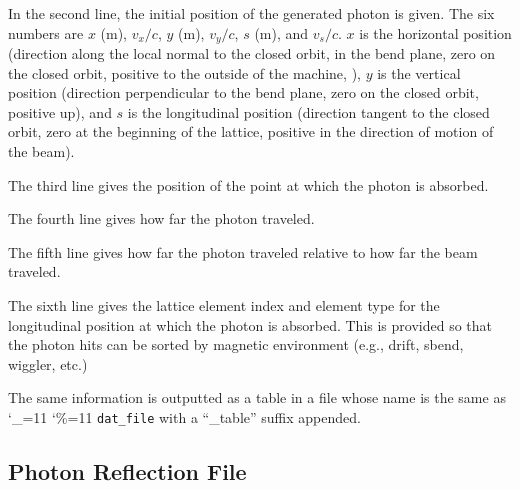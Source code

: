\documentclass[11pt]{article}
\newcommand\ttcmd{\begingroup\catcode`\_=11 \catcode`\%=11 \dottcmd}
\newcommand\dottcmd[1]{\texttt{#1}\endgroup}
\newcommand{\vn}{\ttcmd}
\begin{document}
{{{In the second line, the initial position of the generated photon is
given. The six numbers are $x$ (m), $v_x/c$, $y$ (m), $v_y/c$, $s$
(m), and $v_s/c.$ $x$ is the horizontal position (direction along the
local normal to the closed orbit, in the bend plane, zero on the
closed orbit, positive to the outside of the machine, ), $y$ is the
vertical position (direction perpendicular to the bend plane, zero on
the closed orbit, positive up), and $s$ is the longitudinal position
(direction tangent to the closed orbit, zero at the beginning of the
lattice, positive in the direction of motion of the beam).

The third line gives the position of the point at which the photon is absorbed.

The fourth line gives how far the photon traveled.

The fifth line gives how far the photon traveled relative to how far the beam traveled.

The sixth line gives the lattice element index and element type for
the longitudinal position at which the photon is absorbed. This is
provided so that the photon hits can be sorted by magnetic environment
(e.g., drift, sbend, wiggler, etc.)  

The same information is outputted as a table in a file whose name is
the same as \vn{dat_file} with a ``_table'' suffix appended.

\subsection{Photon Reflection File}
\label{ss:reflection.file}

}}}
\end{document}

